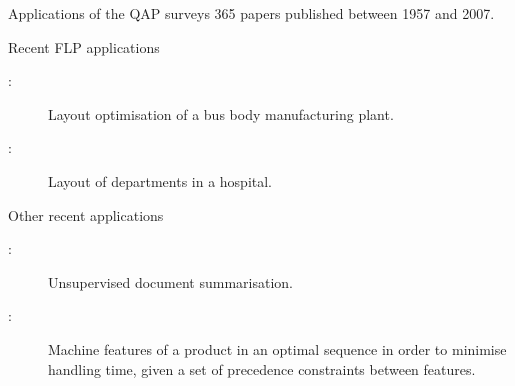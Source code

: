 {{\begin{frame}{Applications of the QAP}
            \citet{Loiola:2007jk} surveys 365 papers published between 1957 and 2007.
        \end{frame}

        \begin{frame}{Recent FLP applications}
            \begin{description}
                \item[\citet{Samanta:2015hk}:] Layout optimisation of a bus body manufacturing plant.
                \item[\citet{XiongfengFeng:2015jo}:] Layout of departments in a hospital.
            \end{description}
        \end{frame}

        \begin{frame}{Other recent applications}
            \begin{description}
                \item[\citet{Alguliyev:2015jw}:] Unsupervised document summarisation.
                \item[\citet{Azab:2015eq}:] Machine features of a product in an optimal sequence in order to minimise handling time, given a set of precedence constraints between features.
            \end{description}
        \end{frame}
    }
}

